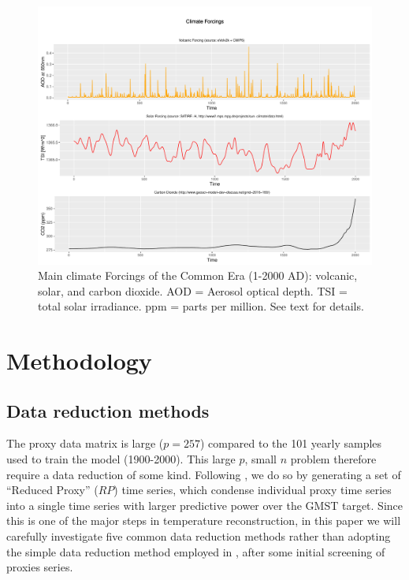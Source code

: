\documentclass[12pt]{amsart}
\theoremstyle{plain}
\theoremstyle{definition}
\theoremstyle{remark}
\begin{document}
\begin{figure}
  \centering
  \includegraphics[scale=0.40]{forcings}
  \caption{Main climate Forcings of the Common Era (1-2000 AD): volcanic, solar, and carbon dioxide. AOD = Aerosol optical depth. TSI = total solar irradiance. ppm = parts per million. See text for details.}
  \label{fig:forcings}
\end{figure}

\section{Methodology}\label{sec:model}
\subsection{Data reduction methods}
\label{sec:rp}

The proxy data matrix is large ($p=257$) compared to the 101 yearly samples used to train the model (1900-2000). This large $p$, small $n$ problem therefore require  a data reduction of some kind. 
Following \cite{Barboza2014}, we do so by generating a set of ``Reduced Proxy'' ($RP$) time series, which condense individual proxy time series into a single time series with larger predictive power over the GMST target. Since this is one of the major steps in temperature reconstruction, in this paper we will carefully investigate five common data reduction methods rather than adopting the simple data reduction method employed in \cite{Barboza2014}, after some initial screening of proxies series.    
\end{document}
